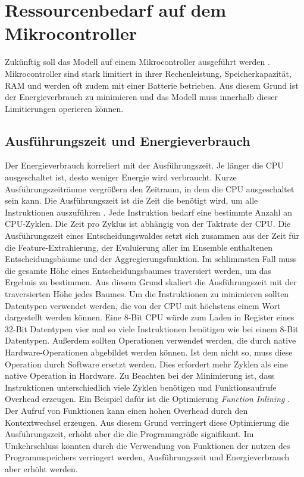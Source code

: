 \section{Ressourcenbedarf auf dem Mikrocontroller}
\label{sec:dt_resource_usage}
Zukünftig soll das Modell auf einem Mikrocontroller ausgeführt werden \cite{antragForschungsprojekt}.
Mikrocontroller sind stark limitiert in ihrer Rechenleistung, Speicherkapazität, RAM und werden oft zudem mit einer Batterie betrieben.
Aus diesem Grund ist der Energieverbrauch zu minimieren und das Modell muss innerhalb dieser Limitierungen operieren können.

\newpage
\subsection{Ausführungszeit und Energieverbrauch}
\label{sub_sec:dt_ru_execution_time}
Der Energieverbrauch korreliert mit der Ausführungszeit.
Je länger die CPU ausgeschaltet ist, desto weniger Energie wird verbraucht.
Kurze Ausführungszeiträume vergrößern den Zeitraum, in dem die CPU ausgeschaltet sein kann.
Die Ausführungszeit ist die Zeit die benötigt wird, um alle Instruktionen auszuführen \cite{dymelThesis}.
Jede Instruktion bedarf eine bestimmte Anzahl an CPU-Zyklen.
Die Zeit pro Zyklus ist abhängig von der Taktrate der CPU.
\newline
\newline
Die Ausführungszeit eines Entscheidungswaldes setzt sich zusammen aus der Zeit für die Feature-Extrahierung, der Evaluierung aller im Ensemble enthaltenen Entscheidungsbäume
und der Aggregierungsfunktion.
Im schlimmsten Fall muss die gesamte Höhe eines Entscheidungsbaumes traversiert werden, um das Ergebnis zu bestimmen. Aus diesem Grund skaliert die Ausführungszeit mit der
traversierten Höhe jedes Baumes.
\newline
\newline
Um die Instruktionen zu minimieren sollten Datentypen verwendet werden, die von der CPU mit höchstens einem Wort dargestellt werden können.
Eine 8-Bit CPU würde zum Laden in Register eines 32-Bit Datentypen vier mal so viele Instruktionen benötigen wie bei einem 8-Bit Datentypen.
Außerdem sollten Operationen verwendet werden, die durch native Hardware-Operationen abgebildet werden können.
Ist dem nicht so, muss diese Operation durch Software ersetzt werden.
Dies erfordert mehr Zyklen als eine native Operation in Hardware.
\newline
\newline
Zu Beachten bei der Minimierung ist, dass Instruktionen unterschiedlich viele Zyklen benötigen und Funktionsaufrufe Overhead erzeugen.
Ein Beispiel dafür ist die Optimierung \textit{Function Inlining} \cite{leupers1999function}.
Der Aufruf von Funktionen kann einen hohen Overhead durch den Kontextwechsel erzeugen.
Aus diesem Grund verringert diese Optimierung die Ausführungszeit, erhöht aber die die Programmgröße signifikant.
Im Umkehrschluss könnten durch die Verwendung von Funktionen der nutzen des Programmspeichers verringert werden, Ausführungszeit und Energieverbrauch aber erhöht werden.

